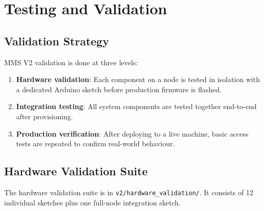 \chapter{Testing and Validation}
\label{ch:testing}

\section{Validation Strategy}

MMS V2 validation is done at three levels:

\begin{enumerate}[leftmargin=1.5em]
    \item \textbf{Hardware validation}: Each component on a node is tested in isolation with a dedicated Arduino sketch before production firmware is flashed.
    \item \textbf{Integration testing}: All system components are tested together end-to-end after provisioning.
    \item \textbf{Production verification}: After deploying to a live machine, basic access tests are repeated to confirm real-world behaviour.
\end{enumerate}

\section{Hardware Validation Suite}

The hardware validation suite is in \texttt{v2/hardware\_validation/}. It consists of 12 individual sketches plus one full-node integration sketch.

